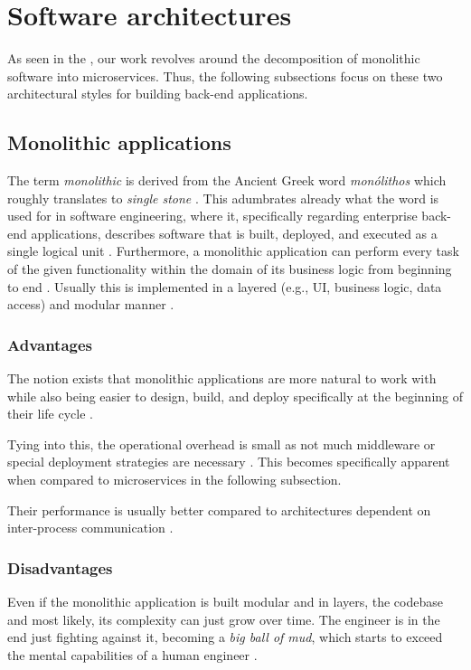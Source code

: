 \documentclass[12pt,a4paper]{report}
\begin{document}
\section{Software architectures} \label{sect:background-architecture}

As seen in the \textit{}, our work revolves around
the decomposition of monolithic software into microservices. Thus, the
following subsections focus on these two architectural styles for building
back\hyp end applications.


\subsection{Monolithic applications}

The term \textit{monolithic} is derived from the Ancient Greek word
\textit{monólithos} which roughly translates to \textit{single stone}
\cite{press2011oxford}. This adumbrates already what the word is used for in software
engineering, where it, specifically regarding enterprise back-end applications,
describes software that is built, deployed, and executed as a single logical
unit \cite{ms-fowler}. Furthermore, a monolithic application can perform every
task of the given functionality within the domain of its business logic from
beginning to end \cite{monolith}. Usually this is implemented in a layered
(e.g., UI, business logic, data access) and modular manner \cite{ms-fowler, monolith}.


\subsubsection{Advantages}
The notion exists that monolithic
applications are more natural to work with while also being easier to design,
build, and deploy specifically at the beginning of their life cycle
\cite{ms-fowler, raymond2003unix}.

Tying into this, the operational overhead is small as not much middleware or
special deployment strategies are necessary \cite{ms-fowler}. This becomes
specifically apparent when compared to microservices in the following
subsection.

Their performance is usually better compared to architectures dependent
on inter-process communication \cite{knoche2016sustaining}.


\subsubsection{Disadvantages}
Even if the monolithic application is built
modular and in layers, the codebase and most likely, its complexity can just
grow over time. The engineer is in the end just fighting against it, becoming a
\textit{big ball of mud}, which starts to exceed the mental capabilities of a
human engineer \cite{newman2015building, foote1997bigballofmud, france2007model}.
\end{document}
